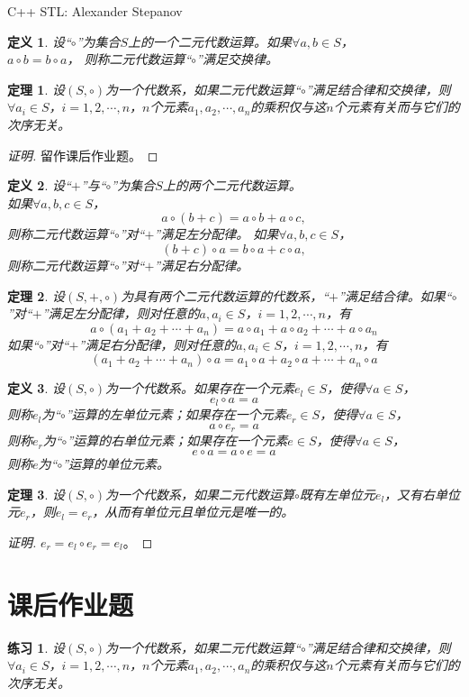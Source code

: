 \documentclass{article}
\newtheorem{Def}{定义}
\newtheorem{Thm}{定理}
\newtheorem{Exercise}{练习}
\begin{document}
\begin{CJK*}{UTF8}{gbsn}
C++ STL: Alexander Stepanov
 \begin{Def}
    设“$\circ$”为集合$S$上的一个二元代数运算。如果$\forall a, b \in S$，\\$a \circ b = b \circ a$， 则称二元代数运算“$\circ$”满足交换律。
  \end{Def}
  \begin{Thm}
    设$(S,\circ)$为一个代数系，如果二元代数运算“$\circ$”满足结合律和交换律，则$\forall a_i\in S$，$i=1,2,\cdots,n$，$n$个元素$a_1,a_2,\cdots,a_n$的乘积仅与这$n$个元素有关而与它们的次序无关。
  \end{Thm}
  \begin{proof}[证明]
留作课后作业题。    
  \end{proof}
  \begin{Def}
    设“$+$”与“$\circ$”为集合$S$上的两个二元代数运算。\\如果$\forall a, b, c \in S$，\[a \circ (b + c) = a \circ b + a \circ c,\] 则称二元代数运算“$\circ$”对“$+$”满足左分配律。
    如果$\forall a, b, c \in S$，\[(b + c)\circ a = b \circ a + c \circ a,\] 则称二元代数运算“$\circ$”对“$+$”满足右分配律。
  \end{Def}
  \begin{Thm}
    设$(S,+,\circ)$为具有两个二元代数运算的代数系，“$+$”满足结合律。如果“$\circ$”对“$+$”满足左分配律，则对任意的$a,a_i\in S$，$i=1,2,\cdots,n$，有
    \[a\circ (a_1+a_2+\cdots+a_n) = a\circ a_1 + a\circ a_2 + \cdots + a\circ a_n\]
    如果“$\circ$”对“$+$”满足右分配律，则对任意的$a,a_i\in S$，$i=1,2,\cdots,n$，有
    \[(a_1+a_2+\cdots+a_n)\circ a  = a_1\circ a + a_2\circ a + \cdots + a_n\circ a\]
  \end{Thm}
  \begin{Def}
    设$(S,\circ)$为一个代数系。如果存在一个元素$e_l\in S$，使得$\forall a\in S$，
    \[e_l\circ a = a\]
    则称$e_l$为“$\circ$”运算的左单位元素；如果存在一个元素$e_r\in S$，使得$\forall a\in S$，
    \[a\circ e_r = a\]
    则称$e_r$为“$\circ$”运算的右单位元素；如果存在一个元素$e\in S$，使得$\forall a\in S$，
    \[e\circ a = a\circ e = a\]
    则称$e$为“$\circ$”运算的单位元素。
  \end{Def}
  \begin{Thm}
    设$(S,\circ)$为一个代数系，如果二元代数运算$\circ$既有左单位元$e_l$，又有右单位元$e_r$，则$e_l=e_r$，从而有单位元且单位元是唯一的。
  \end{Thm}
  \begin{proof}[证明]
    $e_r = e_l\circ e_r = e_l$。
  \end{proof}
  \section{课后作业题}
  \begin{Exercise}
    设$(S,\circ)$为一个代数系，如果二元代数运算“$\circ$”满足结合律和交换律，则$\forall a_i\in S$，$i=1,2,\cdots,n$，$n$个元素$a_1,a_2,\cdots,a_n$的乘积仅与这$n$个元素有关而与它们的次序无关。
  \end{Exercise}


\end{CJK*}
\end{document}
